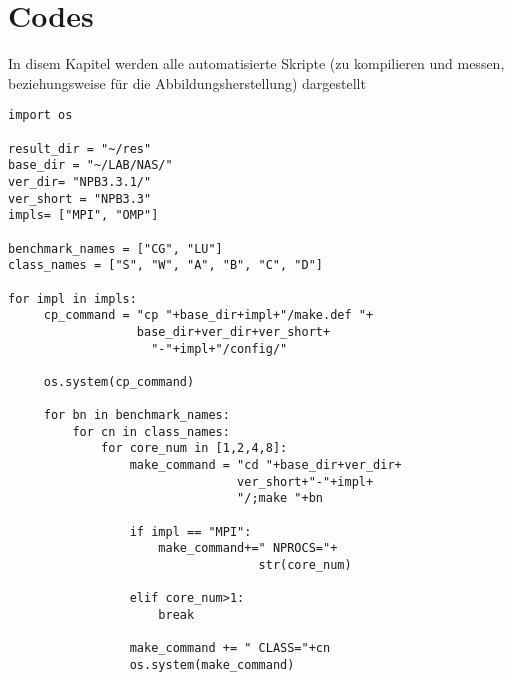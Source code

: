 \chapter{Codes}
\label{chap:Codes}

In disem Kapitel werden alle automatisierte Skripte (zu kompilieren und messen, beziehungsweise für die Abbildungsherstellung) dargestellt

\begin{lstlisting}[label=lst:compile.py, caption={compile.py}]
import os

result_dir = "~/res"
base_dir = "~/LAB/NAS/"
ver_dir= "NPB3.3.1/"
ver_short = "NPB3.3"
impls= ["MPI", "OMP"]

benchmark_names = ["CG", "LU"]
class_names = ["S", "W", "A", "B", "C", "D"]

for impl in impls:
     cp_command = "cp "+base_dir+impl+"/make.def "+
     			  base_dir+ver_dir+ver_short+
     			  	"-"+impl+"/config/"

     os.system(cp_command)

     for bn in benchmark_names:
         for cn in class_names:
             for core_num in [1,2,4,8]:
                 make_command = "cd "+base_dir+ver_dir+
                                ver_short+"-"+impl+
                                "/;make "+bn

                 if impl == "MPI":
                     make_command+=" NPROCS="+
                                   str(core_num)

                 elif core_num>1:
                     break

                 make_command += " CLASS="+cn
                 os.system(make_command)
\end{lstlisting}

